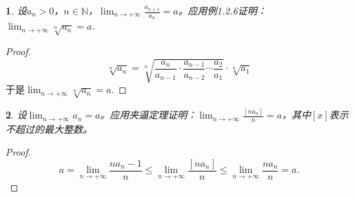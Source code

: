 \documentclass[utf8]{book}
\newtheorem{example}{}[section]             %
\begin{document}
\begin{example}
设$a_n > 0$，$n\in\mathbb{N}$，$\displaystyle \lim_{n\to +\infty}\frac{a_{n+1}}{a_n} = a$。应用例1.2.6证明：$\displaystyle \lim_{n\to +\infty}\sqrt[n]{a_n} = a$.
\end{example}
\begin{proof}
$$\sqrt[n]{a_n} = \sqrt[n]{\frac{a_n}{a_{n-1}}\cdot \frac{a_{n-1}}{a_{n-2}}\cdots\frac{a_2}{a_1}}\cdot \sqrt[n]{a_1}$$
于是$\displaystyle \lim_{n\to +\infty}\sqrt[n]{a_n} = a$.
\end{proof}

\begin{example}
设$\displaystyle \lim_{n\to +\infty}a_n = a$。应用夹逼定理证明：$\displaystyle \lim_{n\to +\infty}\frac{[na_n]}{n} = a$，其中$[x]$表示不超过的最大整数。
\end{example}
\begin{proof}
$$a=\displaystyle \lim_{n\to +\infty}\frac{na_n-1}{n} \leq \displaystyle \lim_{n\to +\infty}\frac{[na_n]}{n} \leq 
\displaystyle \lim_{n\to +\infty}\frac{na_n}{n} = a.$$
\end{proof}
\end{document}
